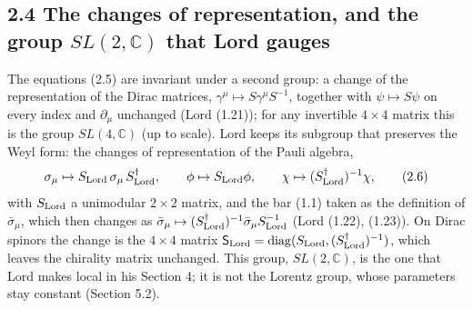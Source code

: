 \documentclass[
  10pt,
]{article}
\begin{document}
\hypertarget{the-changes-of-representation-and-the-group-sl2mathbb-c-that-lord-gauges}{%
\subsection{\texorpdfstring{2.4 The changes of representation, and the
group \(SL(2,\mathbb C)\) that Lord
gauges}{2.4 The changes of representation, and the group SL(2,\textbackslash mathbb C) that Lord gauges}}\label{the-changes-of-representation-and-the-group-sl2mathbb-c-that-lord-gauges}}

The equations (2.5) are invariant under a second group: a change of the
representation of the Dirac matrices,
\(\gamma^\mu\mapsto S\gamma^\mu S^{-1}\), together with
\(\psi\mapsto S\psi\) on every index and \(\partial_\mu\) unchanged
(Lord (1.21)); for any invertible \(4\times4\) matrix this is the group
\(SL(4,\mathbb C)\) (up to scale). Lord keeps its subgroup that
preserves the Weyl form: the changes of representation of the Pauli
algebra,
\[\sigma_\mu\mapsto S_{\rm Lord}\,\sigma_\mu\,S_{\rm Lord}^\dagger,\qquad\phi\mapsto S_{\rm Lord}\phi,\qquad\chi\mapsto(S_{\rm Lord}^\dagger)^{-1}\chi,\tag{2.6}\]
with \(S_{\rm Lord}\) a unimodular \(2\times2\) matrix, and the bar
(1.1) taken as the definition of \(\bar\sigma_\mu\), which then changes
as
\(\bar\sigma_\mu\mapsto(S_{\rm Lord}^\dagger)^{-1}\bar\sigma_\mu S_{\rm Lord}^{-1}\)
(Lord (1.22), (1.23)). On Dirac spinors the change is the \(4\times4\)
matrix
\(\mathsf S_{\rm Lord}=\mathrm{diag}(S_{\rm Lord},(S_{\rm Lord}^\dagger)^{-1})\),
which leaves the chirality matrix unchanged. This group,
\(SL(2,\mathbb C)\), is the one that Lord makes local in his Section 4;
it is not the Lorentz group, whose parameters stay constant (Section
5.2).
\end{document}
